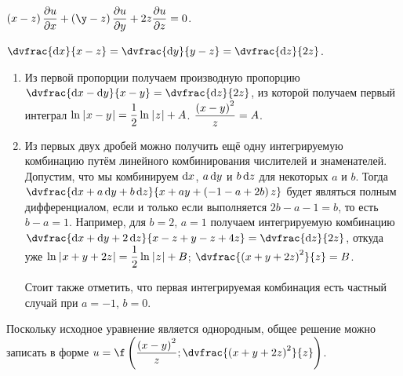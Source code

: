 \documentclass[a5paper,10pt]{article}
\begin{document}
    $\br{x - z} \parder{u} {x} + \br{\y - z} \parder{u} {y} + 2z \parder{u}{z} = 0$.

    $\dvfrac{\di x}{x - z} = \dvfrac{\di y}{y - z} = \dvfrac{\di z}{2z}$.

    \begin{enumerate}
        \item Из первой пропорции получаем производную пропорцию
        $\dvfrac{\di x - \di y}{x - y} = \dvfrac{\di z}{2z}$,
        из которой получаем первый интеграл
        $\ln\hspace{0.2mm}\left|\hspace{0.06em}x - y\hspace{0.06em}\right| = \dfrac{1}{2}\ln\hspace{0.2mm}\left|\hspace{0.06em}z\hspace{0.06em}\right| + A$.
        $\dfrac{\left(\hspace{0.01em}x - y\hspace{0.01em}\right)^{2}}{z} = A$.

        \item Из первых двух дробей можно получить ещё одну
        интегрируемую комбинацию путём линейного комбинирования числителей
        и знаменателей.
        Допустим, что мы комбинируем $\di x$, $a \di y$ и $b \di z$ 
        для некоторых $a$ и $b$. Тогда 
        $\dvfrac{\di x + a \di y + b \di z}{x + ay + \br{-1 - a + 2b} z}$
        будет являться полным дифференциалом, если и только если выполняется
        $2b - a - 1 = b$, то есть $b - a = 1$.
        Например, для $b = 2$, $a = 1$ получаем интегрируемую комбинацию
        $\dvfrac{\di x + \di y + 2 \di z}{x - z + y - z + 4z} = \dvfrac{\di z}{2z}$,
        откуда уже
        $\ln\hspace{0.2mm}\left|\hspace{0.06em}x + y + 2z\hspace{0.06em}\right| = \dfrac{1}{2} \ln\hspace{0.2mm}\left|\hspace{0.06em}z\hspace{0.06em}\right| + B$;
        $\dvfrac{\br{x + y + 2z}^2}{z} = B$.

        Стоит также отметить, что первая интегрируемая комбинация есть частный случай
        при $a = -1$, $b = 0$.
    \end{enumerate}

    Поскольку исходное уравнение является однородным, общее решение можно записать
    в форме
    $u = \f\br{\dfrac{\br{x - y}^{2}}{z}; \dvfrac{\br{x + y + 2z}^2}{z}}$.
\end{document}

